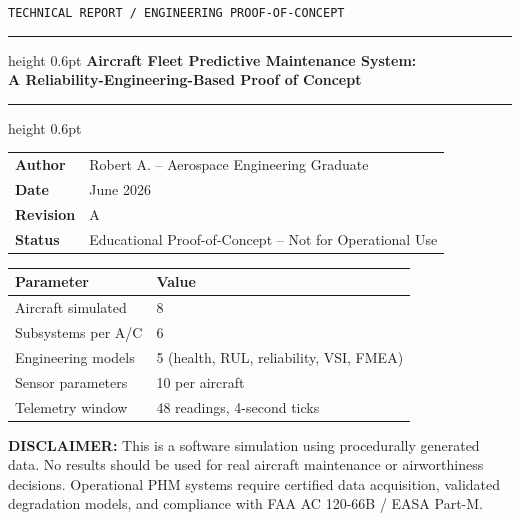 \documentclass[11pt, a4paper]{report}
\begin{document}
\begin{titlepage}
  \centering
  \vspace*{2cm}
  {\small\texttt{TECHNICAL REPORT / ENGINEERING PROOF-OF-CONCEPT}}\\[0.4cm]
  \hrule height 0.6pt
  \vspace{1cm}
  {\LARGE\bfseries Aircraft Fleet Predictive Maintenance System:\\[0.3cm]
  A Reliability-Engineering-Based Proof of Concept}\\[1.5cm]
  \hrule height 0.6pt
  \vspace{1.5cm}
  \begin{tabular}{ll}
    \textbf{Author}  & Robert A. -- Aerospace Engineering Graduate \\[4pt]
    \textbf{Date}    & June 2026 \\[4pt]
    \textbf{Revision}& A \\[4pt]
    \textbf{Status}  & Educational Proof-of-Concept -- Not for Operational Use \\
  \end{tabular}
  \vspace{2cm}

  \begin{tabular}{|l|l|}
    \hline
    \textbf{Parameter}  & \textbf{Value} \\ \hline
    Aircraft simulated  & 8 \\ \hline
    Subsystems per A/C  & 6 \\ \hline
    Engineering models  & 5 (health, RUL, reliability, VSI, FMEA) \\ \hline
    Sensor parameters   & 10 per aircraft \\ \hline
    Telemetry window    & 48 readings, 4-second ticks \\ \hline
  \end{tabular}

  \vfill
  {\small\color{dimgray}
    \textbf{DISCLAIMER:} This is a software simulation using procedurally generated data.
    No results should be used for real aircraft maintenance or airworthiness decisions.
    Operational PHM systems require certified data acquisition, validated degradation models,
    and compliance with FAA AC 120-66B / EASA Part-M.
  }
\end{titlepage}

\tableofcontents
\newpage

\end{document}
